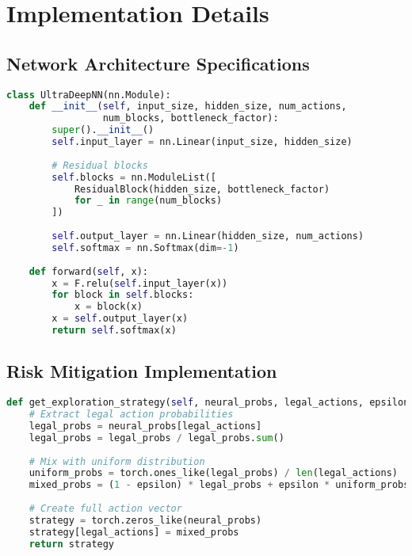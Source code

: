 \documentclass[12pt,a4paper]{article}
\begin{document}
\section{Implementation Details}

\subsection{Network Architecture Specifications}

\begin{lstlisting}[language=Python, caption=Neural Network Architecture]
class UltraDeepNN(nn.Module):
    def __init__(self, input_size, hidden_size, num_actions, 
                 num_blocks, bottleneck_factor):
        super().__init__()
        self.input_layer = nn.Linear(input_size, hidden_size)
        
        # Residual blocks
        self.blocks = nn.ModuleList([
            ResidualBlock(hidden_size, bottleneck_factor) 
            for _ in range(num_blocks)
        ])
        
        self.output_layer = nn.Linear(hidden_size, num_actions)
        self.softmax = nn.Softmax(dim=-1)
    
    def forward(self, x):
        x = F.relu(self.input_layer(x))
        for block in self.blocks:
            x = block(x)
        x = self.output_layer(x)
        return self.softmax(x)
\end{lstlisting}

\subsection{Risk Mitigation Implementation}

\begin{lstlisting}[language=Python, caption=Exploration Mixing]
def get_exploration_strategy(self, neural_probs, legal_actions, epsilon):
    # Extract legal action probabilities
    legal_probs = neural_probs[legal_actions]
    legal_probs = legal_probs / legal_probs.sum()
    
    # Mix with uniform distribution
    uniform_probs = torch.ones_like(legal_probs) / len(legal_actions)
    mixed_probs = (1 - epsilon) * legal_probs + epsilon * uniform_probs
    
    # Create full action vector
    strategy = torch.zeros_like(neural_probs)
    strategy[legal_actions] = mixed_probs
    return strategy
\end{lstlisting}
\end{document}
